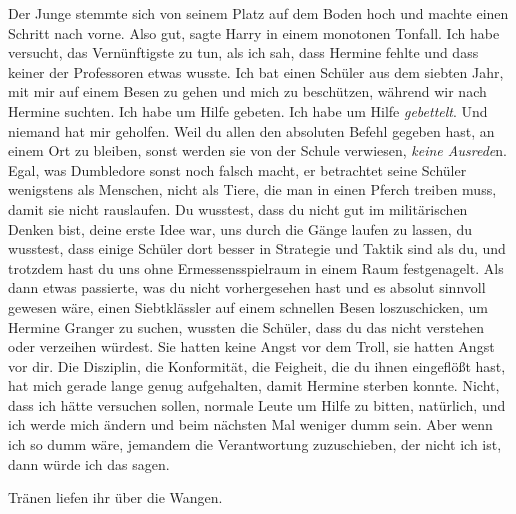 Der Junge stemmte sich von seinem Platz auf dem Boden hoch und machte einen
Schritt nach vorne. \glqq{}Also gut\grqq{}, sagte Harry in einem monotonen
Tonfall. \glqq{}Ich habe versucht, das Vernünftigste zu tun, als ich sah, dass
Hermine fehlte und dass keiner der Professoren etwas wusste. Ich bat einen
Schüler aus dem siebten Jahr, mit mir auf einem Besen zu gehen und mich zu
beschützen, während wir nach Hermine suchten. Ich habe um Hilfe gebeten. Ich
habe um Hilfe \emph{gebettelt}. Und niemand hat mir geholfen. Weil du allen den
absoluten Befehl gegeben hast, an einem Ort zu bleiben, sonst werden sie von der
Schule verwiesen, \emph{keine Ausrede}n. Egal, was Dumbledore sonst noch falsch
macht, er betrachtet seine Schüler wenigstens als Menschen, nicht als Tiere, die
man in einen Pferch treiben muss, damit sie nicht rauslaufen. Du wusstest, dass
du nicht gut im militärischen Denken bist, deine erste Idee war, uns durch die
Gänge laufen zu lassen, du wusstest, dass einige Schüler dort besser in
Strategie und Taktik sind als du, und trotzdem hast du uns ohne
Ermessensspielraum in einem Raum festgenagelt. Als dann etwas passierte, was du
nicht vorhergesehen hast und es absolut sinnvoll gewesen wäre, einen
Siebtklässler auf einem schnellen Besen loszuschicken, um Hermine Granger zu
suchen, wussten die Schüler, dass du das nicht verstehen oder verzeihen würdest.
Sie hatten keine Angst vor dem Troll, sie hatten Angst vor dir. Die Disziplin,
die Konformität, die Feigheit, die du ihnen eingeflößt hast, hat mich gerade
lange genug aufgehalten, damit Hermine sterben konnte. Nicht, dass ich hätte
versuchen sollen, normale Leute um Hilfe zu bitten, natürlich, und ich werde
mich ändern und beim nächsten Mal weniger dumm sein. Aber wenn ich so dumm wäre,
jemandem die Verantwortung zuzuschieben, der nicht ich ist, dann würde ich das
sagen.\grqq{}

Tränen liefen ihr über die Wangen.

